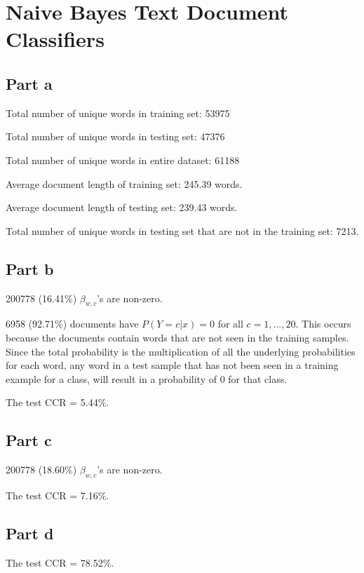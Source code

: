 \documentclass[paper=a4, fontsize=11pt]{scrartcl} %
\numberwithin{equation}{section} %
\numberwithin{figure}{section} %
\numberwithin{table}{section} %
\begin{document}
	\section{Naive Bayes Text Document Classifiers}
	
	\subsection{Part a}
	Total number of unique words in training set: 53975

	\par	
	Total number of unique words in testing set: 47376
	
	\par
	Total number of unique words in entire dataset: 61188
	
	\par
	Average document length of training set: 245.39 words.
	
	\par
	Average document length of testing set: 239.43 words.
	
	\par
	Total number of unique words in testing set that are not in the training set: 7213.
	
	\subsection{Part b}
	200778 (16.41\%) $ \beta_{w,c} $'s are non-zero.
	
	\par
	6958 (92.71\%) documents have $ P(Y=c|x) = 0 $ for all $ c = 1,...,20 $. This occurs because the documents contain words that are not seen in the training samples. Since the total probability is the multiplication of all the underlying probabilities for each word, any word in a test sample that has not been seen in a training example for a class, will result in a probability of 0 for that class.
	
	\par
	The test CCR = 5.44\%.
	
	\subsection{Part c}
	200778 (18.60\%) $ \beta_{w,c} $'s are non-zero.
	
	The test CCR = 7.16\%.
	
	\subsection{Part d}
	The test CCR = 78.52\%.
	
\end{document}
